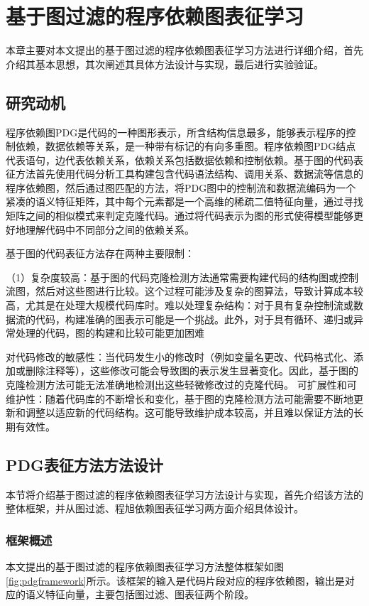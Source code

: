 \chapter{基于图过滤的程序依赖图表征学习}
\label{chap:PDG}
本章主要对本文提出的基于图过滤的程序依赖图表征学习方法进行详细介绍，首先介绍其基本思想，其次阐述其具体方法设计与实现，最后进行实验验证。

\section{研究动机}
\label{sec:PDGMotivation}

程序依赖图PDG是代码的一种图形表示，所含结构信息最多，能够表示程序的控制依赖，数据依赖等关系，是一种带有标记的有向多重图。程序依赖图PDG结点代表语句，边代表依赖关系，依赖关系包括数据依赖和控制依赖。基于图的代码表征方法首先使用代码分析工具构建包含代码语法结构、调用关系、数据流等信息的程序依赖图，然后通过图匹配的方法，将PDG图中的控制流和数据流编码为一个紧凑的语义特征矩阵，其中每个元素都是一个高维的稀疏二值特征向量，通过寻找矩阵之间的相似模式来判定克隆代码。通过将代码表示为图的形式使得模型能够更好地理解代码中不同部分之间的依赖关系。

基于图的代码表征方法存在两种主要限制：

（1）复杂度较高：基于图的代码克隆检测方法通常需要构建代码的结构图或控制流图，然后对这些图进行比较。这个过程可能涉及复杂的图算法，导致计算成本较高，尤其是在处理大规模代码库时。难以处理复杂结构：对于具有复杂控制流或数据流的代码，构建准确的图表示可能是一个挑战。此外，对于具有循环、递归或异常处理的代码，图的构建和比较可能更加困难

对代码修改的敏感性：当代码发生小的修改时（例如变量名更改、代码格式化、添加或删除注释等），这些修改可能会导致图的表示发生显著变化。因此，基于图的克隆检测方法可能无法准确地检测出这些轻微修改过的克隆代码。
可扩展性和可维护性：随着代码库的不断增长和变化，基于图的克隆检测方法可能需要不断地更新和调整以适应新的代码结构。这可能导致维护成本较高，并且难以保证方法的长期有效性。






\section{PDG表征方法方法设计}
\label{sec:PDG}
本节将介绍基于图过滤的程序依赖图表征学习方法设计与实现，首先介绍该方法的整体框架，并从图过滤、程旭依赖图表征学习两方面介绍具体设计。 

\subsection{框架概述}
\label{subsec:PDGOverview}
本文提出的基于图过滤的程序依赖图表征学习方法整体框架如图\ref{fig:pdgframework}所示。该框架的输入是代码片段对应的程序依赖图，输出是对应的语义特征向量，主要包括图过滤、图表征两个阶段。


